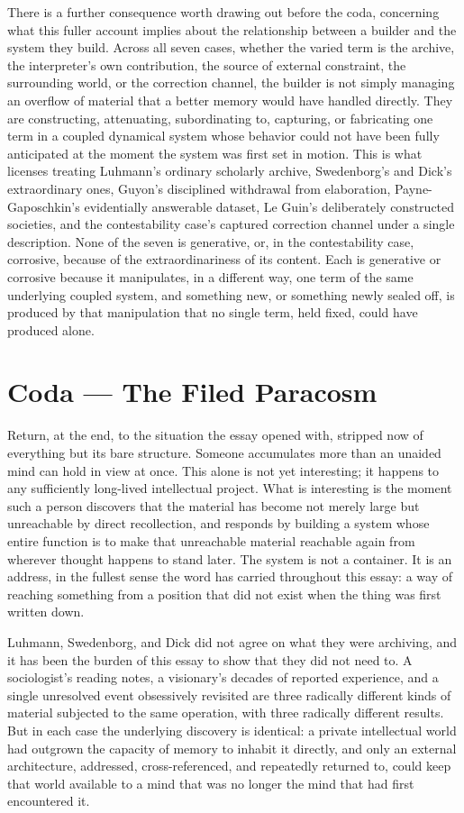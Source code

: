 \documentclass[11pt]{article}
\begin{document}
There is a further consequence worth drawing out before the coda, concerning what this fuller account implies about the relationship between a builder and the system they build. Across all seven cases, whether the varied term is the archive, the interpreter's own contribution, the source of external constraint, the surrounding world, or the correction channel, the builder is not simply managing an overflow of material that a better memory would have handled directly. They are constructing, attenuating, subordinating to, capturing, or fabricating one term in a coupled dynamical system whose behavior could not have been fully anticipated at the moment the system was first set in motion. This is what licenses treating Luhmann's ordinary scholarly archive, Swedenborg's and Dick's extraordinary ones, Guyon's disciplined withdrawal from elaboration, Payne-Gaposchkin's evidentially answerable dataset, Le Guin's deliberately constructed societies, and the contestability case's captured correction channel under a single description. None of the seven is generative, or, in the contestability case, corrosive, because of the extraordinariness of its content. Each is generative or corrosive because it manipulates, in a different way, one term of the same underlying coupled system, and something new, or something newly sealed off, is produced by that manipulation that no single term, held fixed, could have produced alone.

\section{Coda --- The Filed Paracosm}

Return, at the end, to the situation the essay opened with, stripped now of everything but its bare structure. Someone accumulates more than an unaided mind can hold in view at once. This alone is not yet interesting; it happens to any sufficiently long-lived intellectual project. What is interesting is the moment such a person discovers that the material has become not merely large but unreachable by direct recollection, and responds by building a system whose entire function is to make that unreachable material reachable again from wherever thought happens to stand later. The system is not a container. It is an address, in the fullest sense the word has carried throughout this essay: a way of reaching something from a position that did not exist when the thing was first written down.

Luhmann, Swedenborg, and Dick did not agree on what they were archiving, and it has been the burden of this essay to show that they did not need to. A sociologist's reading notes, a visionary's decades of reported experience, and a single unresolved event obsessively revisited are three radically different kinds of material subjected to the same operation, with three radically different results. But in each case the underlying discovery is identical: a private intellectual world had outgrown the capacity of memory to inhabit it directly, and only an external architecture, addressed, cross-referenced, and repeatedly returned to, could keep that world available to a mind that was no longer the mind that had first encountered it.
\end{document}
